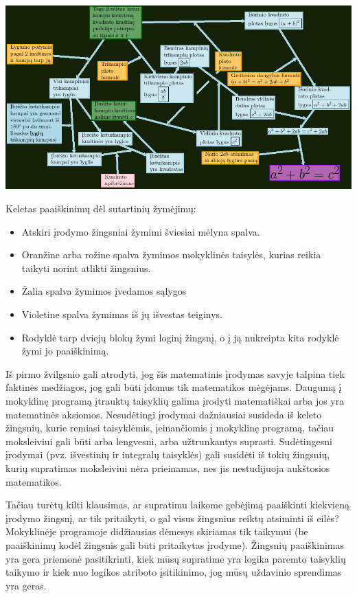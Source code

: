 \documentclass{article}
\begin{document}
\noindent\includegraphics[width=\textwidth]{pythagorian_schema.png}

Keletas paaiškinimų dėl sutartinių žymėjimų:

\begin{itemize}
\item Atskiri įrodymo žingsniai žymimi šviesiai mėlyna spalva.
\item Oranžine arba rožine spalva žymimos mokyklinės taisylės, kurias reikia taikyti norint atlikti žingsnius.
\item Žalia spalva žymimos įvedamos sąlygos
\item Violetine spalva žymimas iš jų išvestas teiginys.
\item Rodyklė tarp dviejų blokų žymi loginį žingsnį, o į ją nukreipta kita rodyklė žymi jo paaiškinimą.
\end{itemize}

Iš pirmo žvilgsnio gali atrodyti, jog šis matematinis įrodymas savyje talpina tiek faktinės medžiagos, jog gali būti įdomus tik matematikos mėgėjams. Daugumą į mokyklinę programą įtrauktų taisyklių galima įrodyti matematiškai arba jos yra matematinės aksiomos. Nesudėtingi įrodymai dažniausiai susideda iš keleto žingsnių, kurie remiasi taisyklėmis, įeinančiomis į mokyklinę programą, tačiau moksleiviui gali būti arba lengvesni, arba užtrunkantys suprasti. Sudėtingesni įrodymai (pvz. išvestinių ir integralų taisyklės) gali susidėti iš tokių žingsnių, kurių supratimas moksleiviui nėra prieinamas, nes jis nestudijuoja aukštosios matematikos. 

Tačiau turėtų kilti klausimas, ar supratimu laikome gebėjimą paaiškinti kiekvieną įrodymo žingsnį, ar tik pritaikyti, o gal visus žingsnius reiktų atsiminti iš eilės? Mokyklinėje programoje didžiausias dėmesys skiriamas tik taikymui (be paaiškinimų kodėl žingsnis gali būti pritaikytas įrodyme). Žingsnių paaiškinimas yra gera priemonė pasitikrinti, kiek mūsų supratime yra logika paremto taisyklių taikymo ir kiek nuo logikos atriboto įsitikinimo, jog mūsų uždavinio sprendimas yra geras.
\end{document}
